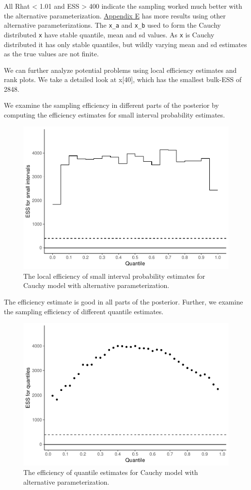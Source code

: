 \documentclass[american,]{article}
\begin{document}
All Rhat \textless{} 1.01 and ESS \textgreater{} 400 indicate the
sampling worked much better with the alternative parameterization.
\protect\hyperlink{AppendixE}{Appendix E} has more results using other
alternative parameterizations. The \texttt{x\_a} and \texttt{x\_b} used
to form the Cauchy distributed \texttt{x} have stable quantile, mean and
sd values. As \texttt{x} is Cauchy distributed it has only stable
quantiles, but wildly varying mean and sd estimates as the true values
are not finite.

We can further analyze potential problems using local efficiency
estimates and rank plots. We take a detailed look at x{[}40{]}, which
has the smallest bulk-ESS of 2848.

We examine the sampling efficiency in different parts of the posterior
by computing the efficiency estimates for small interval probability
estimates.

\begin{figure}[t]
  \centering
  \includegraphics[width=0.6\linewidth]{graphics/local-ess-fit-alt1-1.pdf}
  \caption{The local efficiency of small interval probability estimates for Cauchy model with alternative parameterization.}
\end{figure}

The efficiency estimate is good in all parts of the posterior. Further,
we examine the sampling efficiency of different quantile estimates.

\begin{figure}[t]
  \centering
  \includegraphics[width=0.6\linewidth]{graphics/quantile-ess-fit-alt1-1.pdf}
  \caption{The efficiency of quantile estimates for Cauchy model with alternative parameterization.}
\end{figure}
\end{document}
